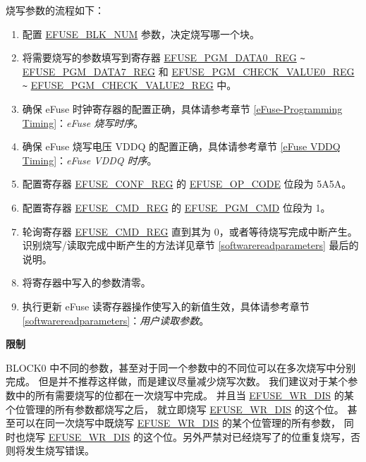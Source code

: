 \documentclass[main\_\_CN.tex]{subfiles}
\begin{document}
烧写参数的流程如下：
\begin{enumerate}
\item 配置 \hyperref[fielddesc:EFUSEBLKNUM]{EFUSE\_BLK\_NUM} 参数，决定烧写哪一个块。

\item 将需要烧写的参数填写到寄存器 \hyperref[regdesc:EFUSEPGMDATANREG]{EFUSE\_PGM\_DATA0\_REG} \verb+~+ \hyperref[regdesc:EFUSEPGMDATANREG]{EFUSE\_PGM\_DATA7\_REG} 和 \hyperref[regdesc:EFUSEPGMCHECKVALUENREG]{EFUSE\_PGM\_CHECK\_VALUE0\_REG}  \verb+~+  \hyperref[regdesc:EFUSEPGMCHECKVALUENREG]{EFUSE\_PGM\_CHECK\_VALUE2\_REG} 中。

\item 确保 eFuse 时钟寄存器的配置正确，具体请参考章节 \ref{eFuse-Programming Timing}：\textit{eFuse
烧写时序}。

\item 确保 eFuse 烧写电压 VDDQ 的配置正确，具体请参考章节 \ref{eFuse VDDQ Timing}：\textit{eFuse VDDQ
时序}。

\item 配置寄存器 \hyperref[regdesc:EFUSECONFREG]{EFUSE\_CONF\_REG} 的 \hyperref[fielddesc:EFUSEOPCODE]{EFUSE\_OP\_CODE} 位段为 \hexprefix{}5A5A。

\item 配置寄存器 \hyperref[regdesc:EFUSECMDREG]{EFUSE\_CMD\_REG} 的 \hyperref[fielddesc:EFUSEPGMCMD]{EFUSE\_PGM\_CMD} 位段为 1。

\item 轮询寄存器 \hyperref[regdesc:EFUSECMDREG]{EFUSE\_CMD\_REG} 直到其为 \hexprefix{}0，或者等待烧写完成中断产生。识别烧写/读取完成中断产生的方法详见章节 \ref{softwarereadparameters} 最后的说明。

\item 将寄存器中写入的参数清零。

\item 执行更新 eFuse 读寄存器操作使写入的新值生效，具体请参考章节 \ref{softwarereadparameters}：\textit{用户读取参数}。
\end{enumerate}

{\bfseries 限制}

BLOCK0 中不同的参数，甚至对于同一个参数中的不同位可以在多次烧写中分别完成。
但是并不推荐这样做，而是建议尽量减少烧写次数。
我们建议对于某个参数中的所有需要烧写的位都在一次烧写中完成。
并且当 \hyperref[fielddesc:EFUSEWRDIS]{EFUSE\_WR\_DIS} 的某个位管理的所有参数都烧写之后，
就立即烧写 \hyperref[fielddesc:EFUSEWRDIS]{EFUSE\_WR\_DIS} 的这个位。
甚至可以在同一次烧写中既烧写 \hyperref[fielddesc:EFUSEWRDIS]{EFUSE\_WR\_DIS} 的某个位管理的所有参数，
同时也烧写 \hyperref[fielddesc:EFUSEWRDIS]{EFUSE\_WR\_DIS} 的这个位。另外严禁对已经烧写了的位重复烧写，否则将发生烧写错误。
\end{document}
